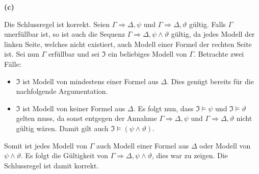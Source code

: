 \documentclass[11pt, a4paper]{article}
\begin{document}
\textbf{(c)}
\begin{adjustwidth}{20pt}{20pt}
Die Schlussregel ist korrekt. Seien $\Gamma \Rightarrow \Delta,\psi$ und $\Gamma \Rightarrow \Delta,\vartheta$ gültig. Falls $\Gamma$ unerfüllbar ist, so ist auch die Sequenz
$\Gamma \Rightarrow \Delta,\psi \wedge \vartheta$ gültig, da jedes Modell der linken Seite, welches nicht existiert, auch Modell einer Formel der rechten Seite ist. Sei nun
$\Gamma$ erfüllbar und sei $\mathfrak{I}$ ein beliebiges Modell von $\Gamma$. Betrachte zwei Fälle:
\begin{itemize}
\item $\mathfrak{I}$ ist Modell von mindestens einer Formel aus $\Delta$. Dies genügt bereits für die nachfolgende Argumentation.
\item $\mathfrak{I}$ ist Modell von keiner Formel aus $\Delta$. Es folgt nun, dass $\mathfrak{I} \models \psi$ und $\mathfrak{I} \models \vartheta$ gelten muss, da sonst entgegen
	der Annahme $\Gamma \Rightarrow \Delta,\psi$ und $\Gamma \Rightarrow \Delta,\vartheta$ nicht gültig wären. Damit gilt auch $\mathfrak{I} \models (\psi \wedge \vartheta)$. 
\end{itemize}
Somit ist jedes Modell von $\Gamma$ auch Modell einer Formel aus $\Delta$ oder Modell von $\psi \wedge \vartheta$. Es folgt die Gültigkeit von $\Gamma \Rightarrow \Delta,\psi \wedge
\vartheta$, dies war zu zeigen. Die Schlussregel ist damit korrekt.
\end{adjustwidth}
\end{document}
